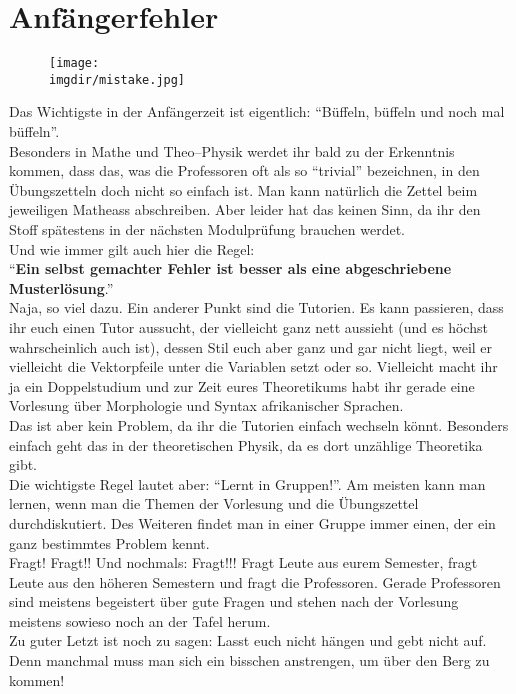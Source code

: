 \section{Anfängerfehler}
\begin{figure}[!b]
	\centering
  	\texttt{[image: \\imgdir/mistake.jpg]}
\end{figure}
Das Wichtigste in der Anfängerzeit ist eigentlich: \enquote{Büffeln, büffeln und noch mal büffeln}.\\
Besonders in Mathe und Theo--Physik werdet ihr bald zu der Erkenntnis kommen, dass das, was die Professoren oft als so \enquote{trivial} bezeichnen, in den Übungszetteln doch nicht so einfach ist. Man kann natürlich die Zettel beim jeweiligen Matheass abschreiben. Aber leider hat das keinen Sinn, da ihr den Stoff spätestens in der nächsten Modulprüfung brauchen werdet.\\
Und wie immer gilt auch hier die Regel:\\
\enquote{\textbf{Ein selbst gemachter Fehler ist besser als eine abgeschriebene Musterlösung}.}\\
Naja, so viel dazu. Ein anderer Punkt sind die Tutorien. Es kann passieren, dass ihr euch einen Tutor aussucht, der vielleicht ganz nett aussieht (und es höchst wahrscheinlich auch ist), dessen Stil euch aber ganz und gar nicht liegt, weil er vielleicht die Vektorpfeile unter die Variablen setzt oder so. Vielleicht macht ihr ja ein Doppelstudium und zur Zeit eures Theoretikums habt ihr gerade eine Vorlesung über Morphologie und Syntax afrikanischer Sprachen.\\
Das ist aber kein Problem, da ihr die Tutorien einfach wechseln könnt. Besonders einfach geht das in der theoretischen Physik, da es dort unzählige Theoretika gibt.\\
Die wichtigste Regel lautet aber: \enquote{Lernt in Gruppen!}. Am meisten kann man lernen, wenn man die Themen der Vorlesung und die Übungszettel durchdiskutiert. Des Weiteren findet man in einer Gruppe immer einen, der ein ganz bestimmtes Problem kennt.\\
Fragt! Fragt!! Und nochmals: Fragt!!! Fragt Leute aus eurem Semester, fragt Leute aus den höheren Semestern und fragt die Professoren. Gerade Professoren sind meistens begeistert über gute Fragen und stehen nach der Vorlesung meistens sowieso noch an der Tafel herum.\\
Zu guter Letzt ist noch zu sagen: Lasst euch nicht hängen und gebt nicht auf. Denn manchmal muss man sich ein bisschen anstrengen, um über den Berg zu kommen!
